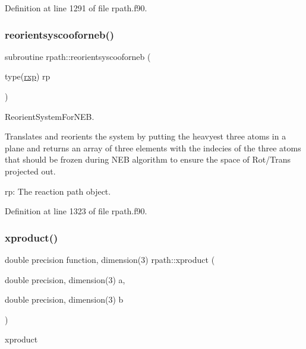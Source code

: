 Definition at line 1291 of file rpath.\+f90.

\mbox{\label{namespacerpath_a9c5a494d479b12f65ad8913faf4f4028}} 
\subsubsection{\texorpdfstring{reorientsyscooforneb()}{reorientsyscooforneb()}}
{\footnotesize\ttfamily subroutine rpath\+::reorientsyscooforneb (\begin{DoxyParamCaption}\item[{type(\mbox{\hyperlink{structrpath_1_1rxp}{rxp}})}]{rp }\end{DoxyParamCaption})}



Reorient\+System\+For\+N\+EB. 

Translates and reorients the system by putting the heavyest three atoms in a plane and returns an array of three elements with the indecies of the three atoms that should be frozen during N\+EB algorithm to ensure the space of Rot/\+Trans \textquotesingle{}projected out\textquotesingle{}.


\begin{DoxyItemize}
\item rp\+: The reaction path object. 
\end{DoxyItemize}

Definition at line 1323 of file rpath.\+f90.

\mbox{\label{namespacerpath_a5d207ca62bfc4e1fa21f80f112ebaa08}} 
\subsubsection{\texorpdfstring{xproduct()}{xproduct()}}
{\footnotesize\ttfamily double precision function, dimension(3) rpath\+::xproduct (\begin{DoxyParamCaption}\item[{double precision, dimension(3)}]{a,  }\item[{double precision, dimension(3)}]{b }\end{DoxyParamCaption})}



xproduct 

